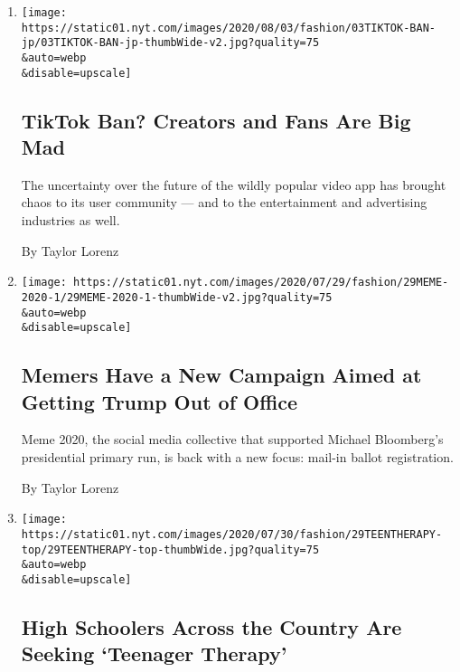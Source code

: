 \begin{enumerate}
\def\labelenumi{\arabic{enumi}.}
\item
  \href{/2020/08/02/style/tiktok-ban-threat-trump.html}{}

  \texttt{[image: https://static01.nyt.com/images/2020/08/03/fashion/03TIKTOK-BAN-jp/03TIKTOK-BAN-jp-thumbWide-v2.jpg?quality=75\\\&auto=webp\\\&disable=upscale]}

  \hypertarget{tiktok-ban-creators-and-fans-are-big-mad}{%
  \subsection{TikTok Ban? Creators and Fans Are Big
  Mad}\label{tiktok-ban-creators-and-fans-are-big-mad}}

  The uncertainty over the future of the wildly popular video app has
  brought chaos to its user community --- and to the entertainment and
  advertising industries as well.

  By Taylor Lorenz
\item
  \href{/2020/07/29/style/meme-2020-lincoln-project-election.html}{}

  \texttt{[image: https://static01.nyt.com/images/2020/07/29/fashion/29MEME-2020-1/29MEME-2020-1-thumbWide-v2.jpg?quality=75\\\&auto=webp\\\&disable=upscale]}

  \hypertarget{memers-have-a-new-campaign-aimed-at-getting-trump-out-of-office}{%
  \subsection{Memers Have a New Campaign Aimed at Getting Trump Out of
  Office}\label{memers-have-a-new-campaign-aimed-at-getting-trump-out-of-office}}

  Meme 2020, the social media collective that supported Michael
  Bloomberg's presidential primary run, is back with a new focus:
  mail-in ballot registration.

  By Taylor Lorenz
\item
  \href{/2020/07/29/style/teenager-therapy-podcast.html}{}

  \texttt{[image: https://static01.nyt.com/images/2020/07/30/fashion/29TEENTHERAPY-top/29TEENTHERAPY-top-thumbWide.jpg?quality=75\\\&auto=webp\\\&disable=upscale]}

  \hypertarget{high-schoolers-across-the-country-are-seeking-teenager-therapy}{%
  \subsection{High Schoolers Across the Country Are Seeking `Teenager
  Therapy'}\label{high-schoolers-across-the-country-are-seeking-teenager-therapy}}


\end{enumerate}
